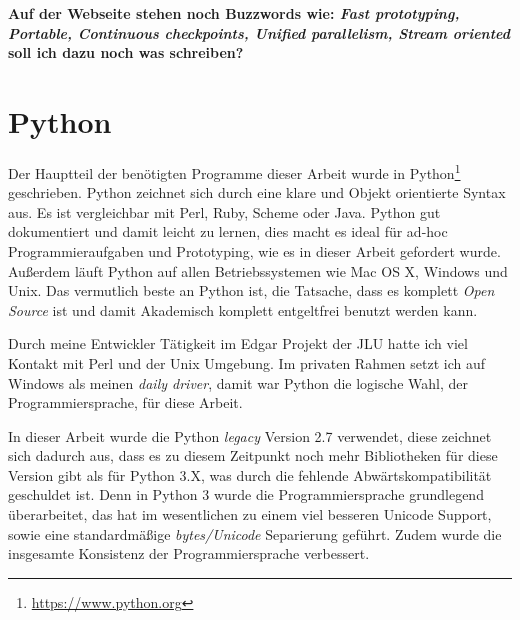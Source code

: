 \textbf{Auf der Webseite stehen noch Buzzwords wie: \emph{Fast prototyping, Portable, Continuous checkpoints, Unified parallelism, Stream oriented} soll ich dazu noch was schreiben?}



\section{Python}
Der Hauptteil der benötigten Programme dieser Arbeit wurde in Python\footnote{\url{https://www.python.org}} geschrieben. Python zeichnet sich durch eine klare und Objekt orientierte Syntax aus. Es ist vergleichbar mit Perl, Ruby, Scheme oder Java. Python gut dokumentiert und damit leicht zu lernen, dies macht es ideal für ad-hoc Programmieraufgaben und Prototyping, wie es in dieser Arbeit gefordert wurde. Außerdem läuft Python auf allen Betriebssystemen wie Mac OS X, Windows und Unix. Das vermutlich beste an Python ist, die Tatsache, dass es komplett \emph{Open Source} ist und damit Akademisch komplett entgeltfrei benutzt werden kann.

Durch meine Entwickler Tätigkeit im Edgar\cite{Yu.2017} Projekt der JLU hatte ich viel Kontakt mit Perl und der Unix Umgebung. Im privaten Rahmen setzt ich auf Windows als meinen \emph{daily driver}, damit war Python die logische Wahl, der Programmiersprache, für diese Arbeit.

In dieser Arbeit wurde die Python \emph{legacy} Version 2.7 verwendet, diese zeichnet sich dadurch aus, dass es zu diesem Zeitpunkt noch mehr Bibliotheken für diese Version gibt als für Python 3.X, was durch die fehlende Abwärtskompatibilität geschuldet ist. Denn in Python 3 wurde die Programmiersprache grundlegend überarbeitet, das hat im wesentlichen zu einem viel besseren Unicode Support, sowie eine standardmäßige \emph{bytes/Unicode} Separierung geführt. Zudem wurde die insgesamte Konsistenz der Programmiersprache verbessert.


